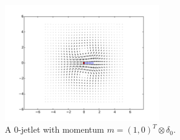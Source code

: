 \documentclass[12pt]{amsart}
\begin{document}
\begin{figure}
	\centering
	\includegraphics[width = 0.6\textwidth]{./images/zero_jet}
	\caption{A $0$-jetlet with momentum $m = (1,0)^T \otimes \delta_0$.}
	\label{fig:zero_jetlet}
\end{figure}
\end{document}
